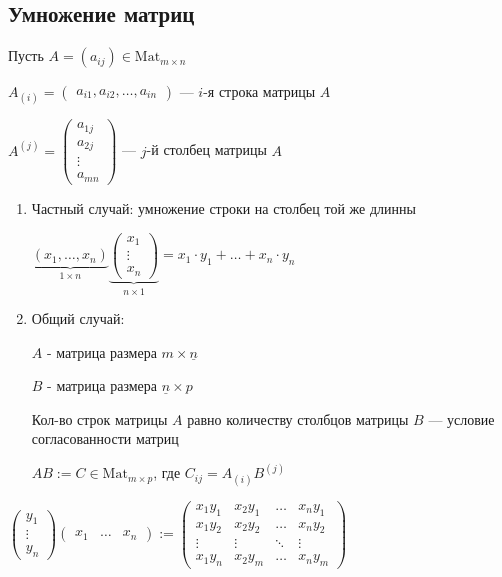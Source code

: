 \subsection{Умножение матриц}

Пусть $A = (a_{ij}) \in \text{Mat}_{m \times n}$

\bigskip

$A_{(i)} = \begin{pmatrix} a_{i1}, a_{i2}, \dots, a_{in} \end{pmatrix} $ --- $i$-я строка матрицы $A$

$A^{(j)} = \begin{pmatrix} a_{1j} \\ a_{2j} \\ \vdots \\ a_{mn} \end{pmatrix} $ --- $j$-й  столбец матрицы $A$

\begin{enumerate}[label=\arabic*)]
    \item 
        Частный случай: умножение строки на столбец той же длинны
    
        $\underbrace{(x_1, \dots, x_n)}_{1 \times n} 
        \underbrace{\begin{pmatrix}
            x_1 \\ \vdots \\ x_n
        \end{pmatrix}}_{n \times 1} 
        = x_1 \cdot y_1 + \dots + x_n \cdot y_n$
        
    \item
        Общий случай:

        $A$ - матрица размера $m \times \underline{n}$
        
        $B$ - матрица размера $\underline{n} \times p$
        
        Кол-во строк матрицы $A$ равно количеству столбцов матрицы $B$ --- условие согласованности матриц
        
        $AB := C \in \text{Mat}_{m \times p}$, где $C_{ij} = A_{(i)} B^{(j)}$
\end{enumerate}

\begin{example}
    \( \begin{pmatrix}
        y_1 \\ \vdots \\ y_n
    \end{pmatrix} 
    \begin{pmatrix}
        x_1 & \dots & x_n
    \end{pmatrix}
    := 
    \begin{pmatrix}
        x_1 y_1 & x_2 y_1 & \dots & x_n y_1 \\
        x_1 y_2 & x_2 y_2 & \dots & x_n y_2 \\
        \vdots & \vdots & \ddots & \vdots \\
        x_1 y_n & x_2 y_m & \dots & x_n y_m 
    \end{pmatrix} \)
\end{example}

